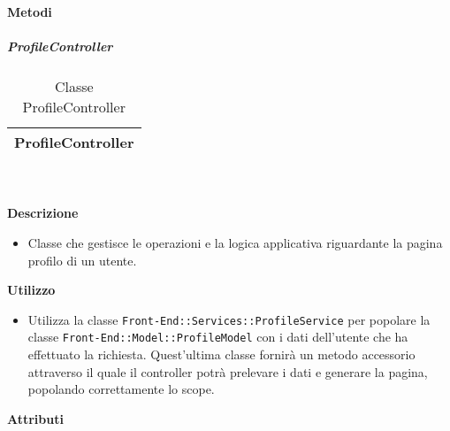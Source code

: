 		\textbf{Metodi} 
	\begin{itemize}
		\end{itemize}
			\subparagraph{ProfileController} 
\begin{table}[ht]
\begin{center}
\bgroup
	\setlength{\arrayrulewidth}{0.6mm}
	\def\arraystretch{1}
		\begin{tabular}{ | p{12cm} | }
				\hline  
					\centerline{\textbf{ProfileController}}
		\\ \hline 
				\hline
				\hline
		
		\end{tabular}
\egroup
\caption{Classe ProfileController}
\end{center}
\end{table}  \textbf{\\ \\ Descrizione} 
					\begin{itemize}
						\item[] Classe che gestisce le operazioni e la logica applicativa riguardante la pagina profilo di un utente.
					\end{itemize}      
				\textbf{Utilizzo}  
					\begin{itemize}
						\item[] Utilizza la classe \texttt{Front-End::Services::ProfileService} per popolare la classe \texttt{Front-End::Model::ProfileModel} con i dati dell'utente che ha effettuato la richiesta. Quest'ultima classe fornirà un metodo accessorio attraverso il quale il controller potrà prelevare i dati e generare la pagina, popolando correttamente lo scope.
					\end{itemize}
			 \textbf{Attributi} 
	\begin{itemize}
		\end{itemize}
		
